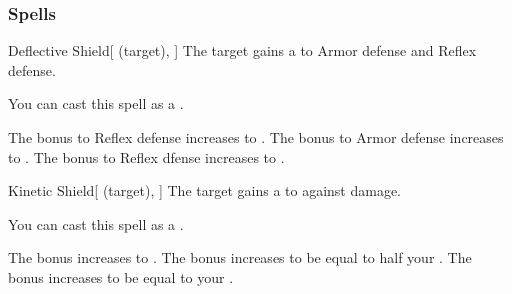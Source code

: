 \subsubsection{Spells}


\lowercase{\hypertarget{spell:Deflective Shield}{}}\label{spell:Deflective Shield}
\begin{attuneability}[Rank 1]{\hypertarget{spell:Deflective Shield}{Deflective Shield}}[ (target), ]
The target gains a   to Armor defense and Reflex defense.

You can cast this spell as a .

\rankline
{} The bonus to Reflex defense increases to .
 The bonus to Armor defense increases to .
 The bonus to Reflex dfense increases to .
\end{attuneability}
\vspace{0.25em}



\lowercase{\hypertarget{spell:Kinetic Shield}{}}\label{spell:Kinetic Shield}
\begin{attuneability}[Rank 1]{\hypertarget{spell:Kinetic Shield}{Kinetic Shield}}[ (target), ]
The target gains a   to  against  damage.

You can cast this spell as a .

\rankline
{} The bonus increases to .
 The bonus increases to be equal to half your .
 The bonus increases to be equal to your .
\end{attuneability}
\vspace{0.25em}



